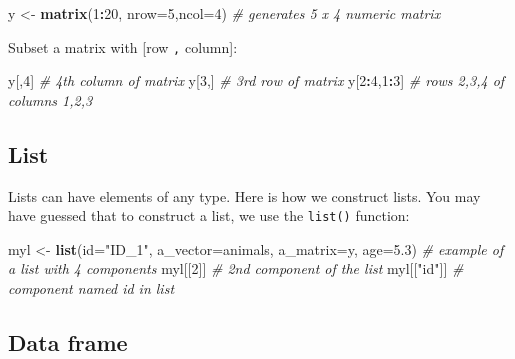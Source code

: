 \documentclass[
]{book}
\newenvironment{Shaded}{\begin{snugshade}}{\end{snugshade}}
\newcommand{\CommentTok}[1]{\textcolor[rgb]{0.56,0.35,0.01}{\textit{#1}}}
\newcommand{\DataTypeTok}[1]{\textcolor[rgb]{0.13,0.29,0.53}{#1}}
\newcommand{\DecValTok}[1]{\textcolor[rgb]{0.00,0.00,0.81}{#1}}
\newcommand{\FloatTok}[1]{\textcolor[rgb]{0.00,0.00,0.81}{#1}}
\newcommand{\KeywordTok}[1]{\textcolor[rgb]{0.13,0.29,0.53}{\textbf{#1}}}
\newcommand{\NormalTok}[1]{#1}
\newcommand{\OperatorTok}[1]{\textcolor[rgb]{0.81,0.36,0.00}{\textbf{#1}}}
\newcommand{\StringTok}[1]{\textcolor[rgb]{0.31,0.60,0.02}{#1}}
\begin{document}
\begin{Shaded}
\begin{Highlighting}[]
\NormalTok{y <-}\StringTok{ }\KeywordTok{matrix}\NormalTok{(}\DecValTok{1}\OperatorTok{:}\DecValTok{20}\NormalTok{, }\DataTypeTok{nrow=}\DecValTok{5}\NormalTok{,}\DataTypeTok{ncol=}\DecValTok{4}\NormalTok{) }\CommentTok{# generates 5 x 4 numeric matrix}
\end{Highlighting}
\end{Shaded}

Subset a matrix with {[}row \texttt{,} column{]}:

\begin{Shaded}
\begin{Highlighting}[]
\NormalTok{y[,}\DecValTok{4}\NormalTok{]       }\CommentTok{# 4th column of matrix}
\NormalTok{y[}\DecValTok{3}\NormalTok{,]       }\CommentTok{# 3rd row of matrix}
\NormalTok{y[}\DecValTok{2}\OperatorTok{:}\DecValTok{4}\NormalTok{,}\DecValTok{1}\OperatorTok{:}\DecValTok{3}\NormalTok{]  }\CommentTok{# rows 2,3,4 of columns 1,2,3}
\end{Highlighting}
\end{Shaded}

\hypertarget{list}{%
\subsection{List}\label{list}}

Lists can have elements of any type. Here is how we construct lists. You may have guessed that to construct a list, we use the \texttt{list()} function:

\begin{Shaded}
\begin{Highlighting}[]
\NormalTok{myl <-}\StringTok{ }\KeywordTok{list}\NormalTok{(}\DataTypeTok{id=}\StringTok{"ID_1"}\NormalTok{, }\DataTypeTok{a_vector=}\NormalTok{animals, }\DataTypeTok{a_matrix=}\NormalTok{y, }\DataTypeTok{age=}\FloatTok{5.3}\NormalTok{) }\CommentTok{# example of a list with 4 components}
\NormalTok{myl[[}\DecValTok{2}\NormalTok{]] }\CommentTok{# 2nd component of the list}
\NormalTok{myl[[}\StringTok{"id"}\NormalTok{]] }\CommentTok{# component named id in list}
\end{Highlighting}
\end{Shaded}

\hypertarget{data-frame}{%
\subsection{Data frame}\label{data-frame}}
\end{document}
